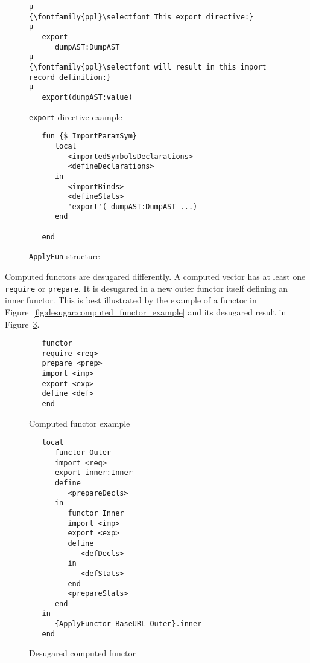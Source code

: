 \documentclass[a4paper]{memoir}
\begin{document}
\begin{figure}[h]
\begin{lstlisting}
µ
{\fontfamily{ppl}\selectfont This export directive:}
µ
   export
      dumpAST:DumpAST
µ
{\fontfamily{ppl}\selectfont will result in this import record definition:}
µ
   export(dumpAST:value)
\end{lstlisting}
\caption{\lstinline!export! directive example}
\label{fig:desugar:export_record}
\end{figure}

\begin{figure}[h]
\begin{lstlisting}
   fun {$ ImportParamSym}
      local
         <importedSymbolsDeclarations>
         <defineDeclarations>
      in
         <importBinds>
         <defineStats>
         'export'( dumpAST:DumpAST ...)
      end
   
   end
\end{lstlisting}
\caption{\lstinline!ApplyFun! structure}
\label{fig:desugar:apply_fun}
\end{figure}


Computed functors are desugared differently. A computed vector has at least one
\lstinline!require! or \lstinline!prepare!. It is desugared in a new outer
functor itself defining an inner functor.  This is best illustrated by the
example of a functor in Figure~\ref{fig:desugar:computed_functor_example} and
its desugared result in
Figure~\ref{fig:desugar:desugared_computed_functor_example}.

\begin{figure}[ht]
\begin{lstlisting}
   functor
   require <req>
   prepare <prep>
   import <imp>
   export <exp>
   define <def>
   end
\end{lstlisting}
\caption{Computed functor example}
\label{fig:desugar:computed_functor_example}

\begin{lstlisting}
   local
      functor Outer
      import <req>
      export inner:Inner
      define
         <prepareDecls>
      in
         functor Inner
         import <imp>
         export <exp>
         define
            <defDecls>
         in
            <defStats>
         end
         <prepareStats>
      end
   in
      {ApplyFunctor BaseURL Outer}.inner
   end
\end{lstlisting}
\caption{Desugared computed functor}
\label{fig:desugar:desugared_computed_functor_example}
\end{figure}
\end{document}
